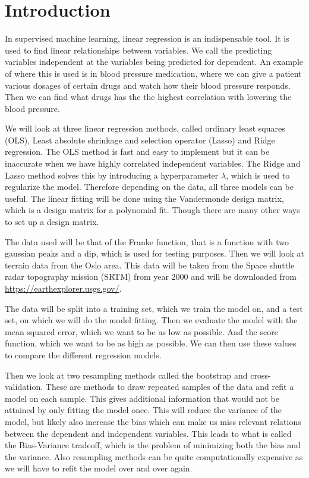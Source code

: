 \section{Introduction}
In supervised machine learning, linear regression is an indispensable tool. It is used to find linear relationships between variables. We call the predicting variables independent at the variables being predicted for dependent. An example of where this is used is in blood pressure medication, where we can give a patient various dosages of certain drugs and watch how their blood pressure responds. Then we can find what drugs has the the highest correlation with lowering the blood pressure. 

We will look at three linear regression methods, called ordinary least squares (OLS), Least absolute shrinkage and selection operator (Lasso) and Ridge regression. The OLS method is fast and easy to implement but it can be inaccurate when we have highly correlated independent variables. The Ridge and Lasso method solves this by introducing a hyperparameter $\lambda$, which is used to regularize the model. Therefore depending on the data, all three models can be useful. The linear fitting will be done using the Vandermonde design matrix, which is a design matrix for a polynomial fit. Though there are many other ways to set up a design matrix.

The data used will be that of the Franke function, that is a function with two gaussian peaks and a dip, which is used for testing purposes. Then we will look at terrain data from the Oslo area. This data will be taken from the Space shuttle radar topography mission (SRTM) from year 2000 and will be downloaded from \href{https://earthexplorer.usgs.gov/}{https://earthexplorer.usgs.gov/}.

The data will be split into a training set, which we train the model on, and a test set, on which we will do the model fitting. Then we evaluate the model with the mean squared error, which we want to be as low as possible. And the score function, which we want to be as high as possible. We can then use these values to compare the different regression models.


Then we look at two resampling methods called the bootstrap and cross-validation. These are methods to draw repeated samples of the data and refit a model on each sample. This gives additional information that would not be attained by only fitting the model once. This will reduce the variance of the model, but likely also increase the bias which can make us miss relevant relations between the dependent and independent variables. This leads to what is called the Bias-Variance tradeoff, which is the problem of minimizing both the bias and the variance. Also resampling methods can be quite computationally expensive as we will have to refit the model over and over again.